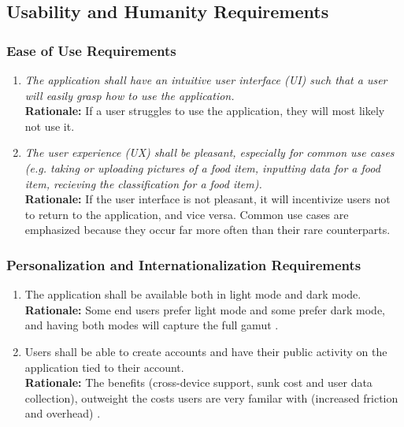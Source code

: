 \documentclass[]{article}
\begin{document}

\subsection{Usability and Humanity Requirements}
\label{sub:usability_and_humanity_requirements}

\subsubsection{Ease of Use Requirements}
\label{ssub:ease_of_use_requirements}
\begin{enumerate}[{UH-EOU}1. ]
    \item \textit{The application shall have an intuitive user interface (UI) such that a user will easily grasp how to use the application.} \\ \textbf{Rationale:} If a user struggles to use the application, they will most likely not use it.
    \item \textit{The user experience (UX) shall be pleasant, especially for common use cases (e.g. taking or uploading pictures of a food item, inputting data for a food item, recieving the classification for a food item).}  \\ \textbf{Rationale:} If the user interface is not pleasant, it will incentivize users not to return to the application, and vice versa. Common use cases are emphasized because they occur far more often than their rare counterparts.
\end{enumerate}

\subsubsection{Personalization and Internationalization Requirements}
\label{ssub:personalization_and_internationalization_requirements}
\begin{enumerate}[{UH-PI}1. ]
    \item The application shall be available both in light mode and dark mode. \\ \textbf{Rationale:} Some end users prefer light mode and some prefer dark mode, and having both modes will capture the full gamut \cite{NNgroup}. 
    \item Users shall be able to create accounts and have their public activity on the application tied to their account. \\ \textbf{Rationale:} The benefits (cross-device support, sunk cost and user data collection), outweight the costs users are very familar with (increased friction and overhead) \cite{phiture2017}.
\end{enumerate}
\end{document}
